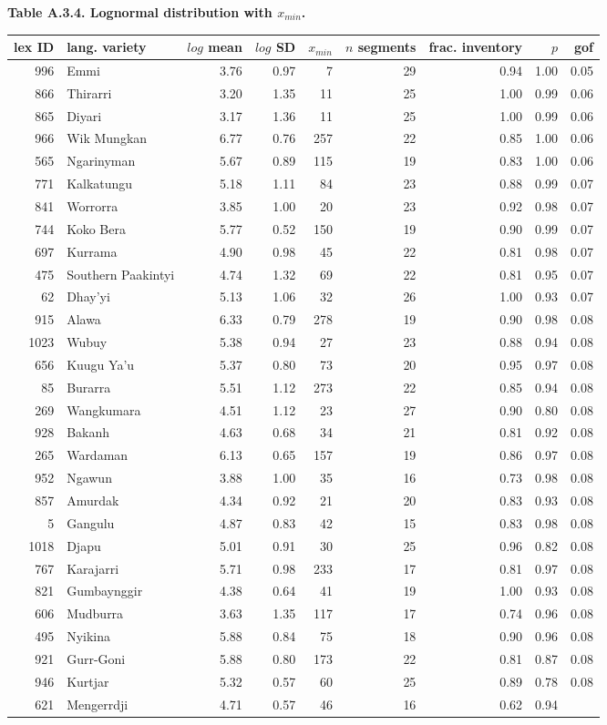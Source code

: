 \newpage

\textbf{Table A.3.4. Lognormal distribution with \(x_{min}\).}

\begin{longtable}[]{@{}rlrrrrrrr@{}}
\toprule
\textbf{lex ID} & \textbf{lang. variety} & \(log\) \textbf{mean} &
\(log\) \textbf{SD} & \(x_{min}\) & \(n\) \textbf{segments} &
\textbf{frac. inventory} & \(p\) & \textbf{gof}\tabularnewline
\midrule
\endhead
996 & Emmi & 3.76 & 0.97 & 7 & 29 & 0.94 & 1.00 & 0.05\tabularnewline
866 & Thirarri & 3.20 & 1.35 & 11 & 25 & 1.00 & 0.99 &
0.06\tabularnewline
865 & Diyari & 3.17 & 1.36 & 11 & 25 & 1.00 & 0.99 & 0.06\tabularnewline
966 & Wik Mungkan & 6.77 & 0.76 & 257 & 22 & 0.85 & 1.00 &
0.06\tabularnewline
565 & Ngarinyman & 5.67 & 0.89 & 115 & 19 & 0.83 & 1.00 &
0.06\tabularnewline
771 & Kalkatungu & 5.18 & 1.11 & 84 & 23 & 0.88 & 0.99 &
0.07\tabularnewline
841 & Worrorra & 3.85 & 1.00 & 20 & 23 & 0.92 & 0.98 &
0.07\tabularnewline
744 & Koko Bera & 5.77 & 0.52 & 150 & 19 & 0.90 & 0.99 &
0.07\tabularnewline
697 & Kurrama & 4.90 & 0.98 & 45 & 22 & 0.81 & 0.98 &
0.07\tabularnewline
475 & Southern Paakintyi & 4.74 & 1.32 & 69 & 22 & 0.81 & 0.95 &
0.07\tabularnewline
62 & Dhay'yi & 5.13 & 1.06 & 32 & 26 & 1.00 & 0.93 & 0.07\tabularnewline
915 & Alawa & 6.33 & 0.79 & 278 & 19 & 0.90 & 0.98 & 0.08\tabularnewline
1023 & Wubuy & 5.38 & 0.94 & 27 & 23 & 0.88 & 0.94 & 0.08\tabularnewline
656 & Kuugu Ya'u & 5.37 & 0.80 & 73 & 20 & 0.95 & 0.97 &
0.08\tabularnewline
85 & Burarra & 5.51 & 1.12 & 273 & 22 & 0.85 & 0.94 &
0.08\tabularnewline
269 & Wangkumara & 4.51 & 1.12 & 23 & 27 & 0.90 & 0.80 &
0.08\tabularnewline
928 & Bakanh & 4.63 & 0.68 & 34 & 21 & 0.81 & 0.92 & 0.08\tabularnewline
265 & Wardaman & 6.13 & 0.65 & 157 & 19 & 0.86 & 0.97 &
0.08\tabularnewline
952 & Ngawun & 3.88 & 1.00 & 35 & 16 & 0.73 & 0.98 & 0.08\tabularnewline
857 & Amurdak & 4.34 & 0.92 & 21 & 20 & 0.83 & 0.93 &
0.08\tabularnewline
5 & Gangulu & 4.87 & 0.83 & 42 & 15 & 0.83 & 0.98 & 0.08\tabularnewline
1018 & Djapu & 5.01 & 0.91 & 30 & 25 & 0.96 & 0.82 & 0.08\tabularnewline
767 & Karajarri & 5.71 & 0.98 & 233 & 17 & 0.81 & 0.97 &
0.08\tabularnewline
821 & Gumbaynggir & 4.38 & 0.64 & 41 & 19 & 1.00 & 0.93 &
0.08\tabularnewline
606 & Mudburra & 3.63 & 1.35 & 117 & 17 & 0.74 & 0.96 &
0.08\tabularnewline
495 & Nyikina & 5.88 & 0.84 & 75 & 18 & 0.90 & 0.96 &
0.08\tabularnewline
921 & Gurr-Goni & 5.88 & 0.80 & 173 & 22 & 0.81 & 0.87 &
0.08\tabularnewline
946 & Kurtjar & 5.32 & 0.57 & 60 & 25 & 0.89 & 0.78 &
0.08\tabularnewline
621 & Mengerrdji & 4.71 & 0.57 & 46 & 16 & 0.62 & 0.94 &

\end{longtable}
